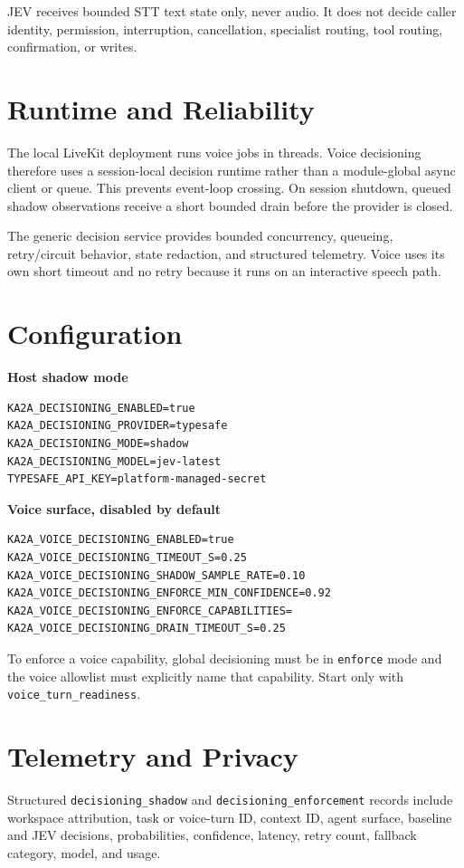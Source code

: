 \documentclass[10pt]{article}
\begin{document}
JEV receives bounded STT text state only, never audio. It does not decide caller identity, permission, interruption, cancellation, specialist routing, tool routing, confirmation, or writes.

\section{Runtime and Reliability}
The local LiveKit deployment runs voice jobs in threads. Voice decisioning therefore uses a session-local decision runtime rather than a module-global async client or queue. This prevents event-loop crossing. On session shutdown, queued shadow observations receive a short bounded drain before the provider is closed.

The generic decision service provides bounded concurrency, queueing, retry/circuit behavior, state redaction, and structured telemetry. Voice uses its own short timeout and no retry because it runs on an interactive speech path.

\section{Configuration}
\textbf{Host shadow mode}
\begin{verbatim}
KA2A_DECISIONING_ENABLED=true
KA2A_DECISIONING_PROVIDER=typesafe
KA2A_DECISIONING_MODE=shadow
KA2A_DECISIONING_MODEL=jev-latest
TYPESAFE_API_KEY=platform-managed-secret
\end{verbatim}

\textbf{Voice surface, disabled by default}
\begin{verbatim}
KA2A_VOICE_DECISIONING_ENABLED=true
KA2A_VOICE_DECISIONING_TIMEOUT_S=0.25
KA2A_VOICE_DECISIONING_SHADOW_SAMPLE_RATE=0.10
KA2A_VOICE_DECISIONING_ENFORCE_MIN_CONFIDENCE=0.92
KA2A_VOICE_DECISIONING_ENFORCE_CAPABILITIES=
KA2A_VOICE_DECISIONING_DRAIN_TIMEOUT_S=0.25
\end{verbatim}

To enforce a voice capability, global decisioning must be in \texttt{enforce} mode and the voice allowlist must explicitly name that capability. Start only with \texttt{voice\_turn\_readiness}.

\section{Telemetry and Privacy}
Structured \texttt{decisioning\_shadow} and \texttt{decisioning\_enforcement} records include workspace attribution, task or voice-turn ID, context ID, agent surface, baseline and JEV decisions, probabilities, confidence, latency, retry count, fallback category, model, and usage.
\end{document}
